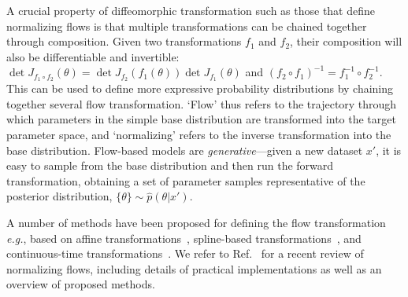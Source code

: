 \documentclass[prd,aps,10pt,nofootinbib,twocolumn,superscriptaddress,preprintnumbers,balancelastpage,longbibliography]{revtex4-1}
\begin{document}
A crucial property of diffeomorphic transformation such as those that define normalizing flows is that multiple transformations can be chained together through composition. Given two transformations $f_1$ and $f_2$, their composition will also be differentiable and invertible: $\operatorname{det}J_{f_{1}\circ f_2}(\theta) = \operatorname{det}J_{f_{2}}\left(f_1(\theta)\right)\operatorname{det}J_{f_{1}}(\theta)$ and $(f_2 \circ f_1)^{-1} = f_1^{-1} \circ f_2^{-1}$. This can be used to define more expressive probability distributions by chaining together several flow transformation. `Flow' thus refers to the trajectory through which parameters in the simple base distribution are transformed into the target parameter space, and `normalizing' refers to the inverse transformation into the base distribution. Flow-based models are \emph{generative}---given a new dataset $x'$, it is easy to sample from the base distribution and then run the forward transformation, obtaining a set of parameter samples representative of the posterior distribution, $\{\theta\}\sim\hat p(\theta|x')$.

A number of methods have been proposed for defining the flow transformation \emph{e.g.}, based on affine transformations~\cite{10.5555/3294771.3294994,kingma2016improved,dinh2016density,dinh2014nice}, spline-based transformations~\cite{durkan2019neural,durkan2019cubic}, and continuous-time transformations~\cite{grathwohl2018ffjord}. We refer to Ref.~\cite{papamakarios2019normalizing} for a recent review of normalizing flows, including details of practical implementations as well as an overview of proposed methods. \\
\end{document}
